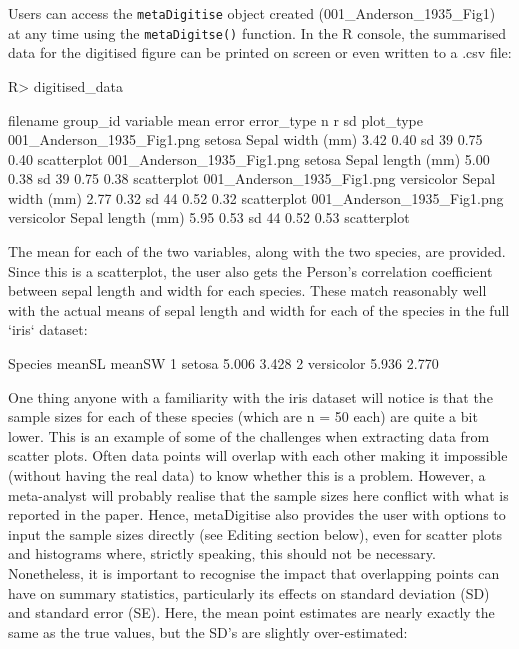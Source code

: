 \documentclass[12pt]{article}
\newcommand{\code}[1]{\texttt{#1}}
\newcommand{\fct}[1]{\texttt{#1()}}
\newcommand{\pkg}[1]{{\fontseries{b}\selectfont #1}}
\let\proglang=\textsf
\begin{document}
Users can access the \code{metaDigitise} object created (001\_Anderson\_1935\_Fig1) at any time using the \fct{metaDigitse} function. In the \proglang{R} console, the summarised data for the digitised figure can be printed on screen or even written to a .csv file:

\begin{CodeChunk}
\begin{CodeInput}
R> digitised_data
\end{CodeInput}
{\scriptsize
\begin{CodeOutput}
                  filename    group_id         variable  mean  error error_type  n     r    sd  plot_type
001_Anderson_1935_Fig1.png      setosa  Sepal width (mm)  3.42  0.40  sd        39  0.75  0.40  scatterplot
001_Anderson_1935_Fig1.png      setosa  Sepal length (mm) 5.00  0.38  sd        39  0.75  0.38  scatterplot
001_Anderson_1935_Fig1.png  versicolor  Sepal width (mm)  2.77  0.32  sd        44  0.52  0.32  scatterplot
001_Anderson_1935_Fig1.png  versicolor  Sepal length (mm) 5.95  0.53  sd        44  0.52  0.53  scatterplot
\end{CodeOutput}
}
\end{CodeChunk}

The mean for each of the two variables, along with the two species, are provided. Since this is a scatterplot, the user also gets the Person's correlation coefficient between sepal length and width for each species. These match reasonably well with the actual means of sepal length and width for each of the species in the full `iris` dataset:

\begin{CodeChunk}
\begin{CodeOutput}
     Species meanSL meanSW
1     setosa  5.006  3.428
2 versicolor  5.936  2.770
\end{CodeOutput}
\end{CodeChunk}

One thing anyone with a familiarity with the iris dataset will notice is that the sample sizes for each of these species (which are n = 50 each) are quite a bit lower. This is an example of some of the challenges when extracting data from scatter plots. Often data points will overlap with each other making it impossible (without having the real data) to know whether this is a problem. However, a meta-analyst will probably realise that the sample sizes here conflict with what is reported in the paper. Hence, \pkg{metaDigitise} also provides the user with  options to input the sample sizes directly (see Editing section below), even for scatter plots and histograms where, strictly speaking, this should not be necessary. Nonetheless, it is important to recognise the impact that overlapping points can have on summary statistics, particularly its effects on standard deviation (SD) and standard error (SE). Here, the mean point estimates are nearly exactly the same as the true values, but the SD's are slightly over-estimated:
\end{document}
